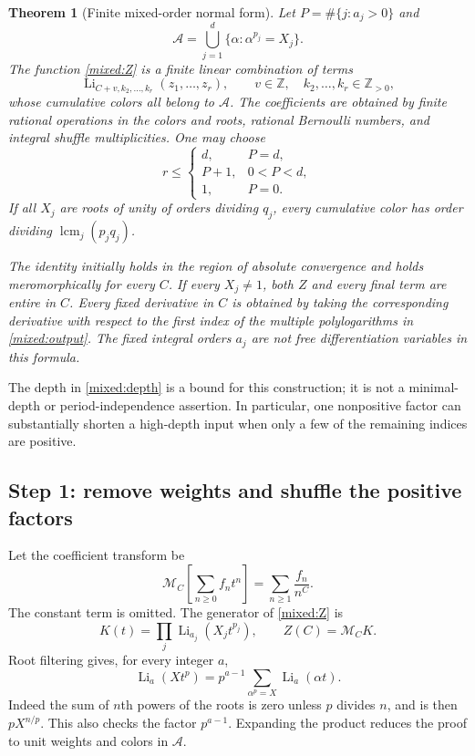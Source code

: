 \documentclass[11pt]{article}
\numberwithin{equation}{section}
\theoremstyle{plain}
\newtheorem{theorem}{Theorem}[section]
\theoremstyle{definition}
\theoremstyle{remark}
\DeclareMathOperator{\Li}{Li}
\DeclareMathOperator{\lcm}{lcm}
\newcommand{\Z}{\mathbb Z}
\newcommand{\Mcal}{\mathcal M}
\begin{document}
\begin{theorem}[Finite mixed-order normal form]\label{mixed:main}
Let $P=\#\{j:a_j>0\}$ and
\[
                \mathcal A=\bigcup_{j=1}^d\{\alpha:\alpha^{p_j}=X_j\}.
\]
The function \eqref{mixed:Z} is a finite linear combination of terms
\begin{equation}\label{mixed:output}
          \Li_{C+v,k_2,\ldots,k_r}(z_1,\ldots,z_r),
 \qquad v\in\Z,\quad k_2,\ldots,k_r\in\Z_{>0},
\end{equation}
whose cumulative colors all belong to $\mathcal A$. The coefficients
are obtained by finite rational operations in the colors and roots,
rational Bernoulli numbers, and integral shuffle multiplicities.
One may choose
\begin{equation}\label{mixed:depth}
 r\le\begin{cases}
 d,&P=d,\\
 P+1,&0<P<d,\\
 1,&P=0.
 \end{cases}
\end{equation}
If all $X_j$ are roots of unity of orders dividing $q_j$, every
cumulative color has order dividing $\lcm_j(p_jq_j)$.

The identity initially holds in the region of absolute convergence
and holds meromorphically for every $C$. If every $X_j\ne1$, both
$Z$ and every final term are entire in $C$. Every fixed derivative
in $C$ is obtained by taking the corresponding derivative with respect
to the first index
of the multiple polylogarithms in \eqref{mixed:output}.
The fixed integral orders $a_j$ are not free differentiation variables
in this formula.
\end{theorem}

The depth in \eqref{mixed:depth} is a bound for this construction;
it is not a minimal-depth or period-independence assertion. In particular,
one nonpositive factor can substantially shorten a high-depth input
when only a few of the remaining indices are positive.

\subsection{Step 1: remove weights and shuffle the positive factors}

Let the coefficient transform be
\[
 \Mcal_C\left[\sum_{n\ge0}f_nt^n\right]
             =\sum_{n\ge1}\frac{f_n}{n^C}.
\]
The constant term is omitted. The generator of \eqref{mixed:Z} is
\begin{equation}\label{mixed:generator}
 K(t)=\prod_j\Li_{a_j}(X_jt^{p_j}),\qquad Z(C)=\Mcal_C K.
\end{equation}
Root filtering gives, for every integer $a$,
\begin{equation}\label{mixed:roots}
            \Li_a(Xt^p)=p^{a-1}\sum_{\alpha^p=X}\Li_a(\alpha t).
\end{equation}
Indeed the sum of $n$th powers of the roots is zero unless $p$ divides
$n$, and is then $pX^{n/p}$. This also checks the factor $p^{a-1}$.
Expanding the product reduces the proof to unit weights and colors
in $\mathcal A$.
\end{document}
